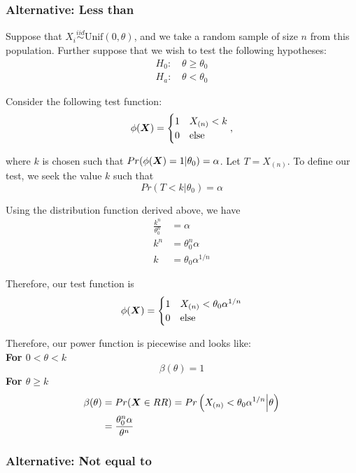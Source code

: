 \documentclass[]{article}
\newcommand{\bfX}{\mbox{\boldmath $X$}}
\begin{document}
\subsubsection{Alternative: Less than}

Suppose that $X_i \stackrel{iid}{\sim} \text{Unif}(0, \theta)$, and we take a random sample of size $n$ from this population. Further suppose that we wish to test the following hypotheses:
\[
\begin{split}
\text{$H_0$: }& \theta \geq \theta_0 \\
\text{$H_a$: }& \theta < \theta_0
\end{split}
\]

Consider the following test function:
\[
\phi(\bfX) = \begin{cases}
1 & X_{(n)} < k \\
0 & \text{else}
\end{cases},
\]

where $k$ is chosen such that $Pr(\phi(\bfX) = 1|\theta_0) = \alpha$. Let $T = X_{(n)}$. To define our test, we seek the value $k$ such that 
\[
Pr(T < k | \theta_0) = \alpha
\]

Using the distribution function derived above, we have
\[
\begin{split}
\frac{k^n}{\theta_0^n} &= \alpha \\
k^n &= \theta_0^n\alpha \\
k &= \theta_0\alpha^{1/n}
\end{split}
\]

Therefore, our test function is
\[
\phi(\bfX) = \begin{cases}
1 & X_{(n)} < \theta_0\alpha^{1/n}  \\
0 & \text{else}
\end{cases}
\]

Therefore, our power function is piecewise and looks like:\\
\textbf{For $0 < \theta < k$}
\[
\beta(\theta) = 1
\]
\textbf{For $\theta \geq k$}
\[
\begin{split}
\beta(\theta) &= Pr(\bfX \in RR) = Pr\left(X_{(n)} < \theta_0\alpha^{1/n} \Big| \theta\right) \\
&= \frac{\theta_0^n\alpha}{\theta^n}
\end{split}
\]

\subsubsection{Alternative: Not equal to}
\end{document}
